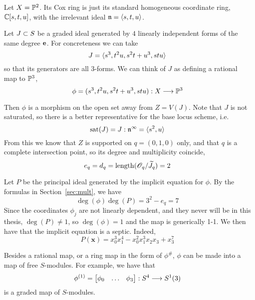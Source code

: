 \documentclass[fleqn,reqno]{amsart}
\begin{document}
\begin{example}[$\mt{ex202}$]
\label{ex202}
Let $X=\mathbb{P}^2$.
Its Cox ring is just its standard homogeneous coordinate ring, $\mathbb{C}[s,t,u]$,
with the irrelevant ideal $\mathfrak{n}=\langle s,t,u\rangle$.

Let $J\subset S$ be a graded ideal generated by $4$ linearly independent forms of the same degree $\mathbf e$.
For concreteness we can take
\[
	J=\langle s^3,t^2u,s^2t+u^3,stu\rangle
\]
so that its generators are all $3$-forms.
We can think of $J$ as defining a rational map to $\mathbb{P}^3$,
\[
	\phi=(s^3,t^2u,s^2t+u^3,stu):X\longrightarrow\mathbb{P}^3
\]

Then $\phi$ is a morphism on the open set away from $Z=V(J)$.
Note that $J$ is not saturated, so there is a better representative for the base locus scheme,
i.e.
\[
\operatorname{sat}(J)=J:\mathfrak{n}^\infty=\langle s^2,u\rangle
\]
From this we know that $Z$ is supported on $q=(0,1,0)$ only,
and that $q$ is a complete intersection point, so its degree and multiplicity coincide,
\[
	e_q=d_q=\operatorname{length}(\mathscr{O}_q/\widetilde{J}_q)=2
\]

Let $P$ be the principal ideal generated by the implicit equation for $\phi$.
By the formulas in Section~\ref{sec:mult}, we have
\[
	\deg(\phi)\deg(P)=3^2-e_q=7
\]
Since the coordinates $\phi_j$ are not linearly dependent,
and they never will be in this thesis,
$\deg(P)\neq1$, so $\deg(\phi)=1$ and the map is generically 1-1.
We then have that the implicit equation is a septic.
Indeed,
\[
	P(\mathbf x)={x}_{0}^{3} {x}_{1}^{4}-{x}_{0}^{2} {x}_{1}^{3} {x}_{2} {x}_{3}+{x}_{3}^{7}
\]

Besides a rational map, or a ring map in the form of $\phi^\#$,
$\phi$ can be made into a map of free $S$-modules.
For example, we have that
\[
	\phi^{(1)}=\begin{bmatrix}\phi_0&\ldots&\phi_3\end{bmatrix}:S^4\longrightarrow S^1(3)
\]
is a graded map of $S$-modules.


\end{example}
\end{document}
